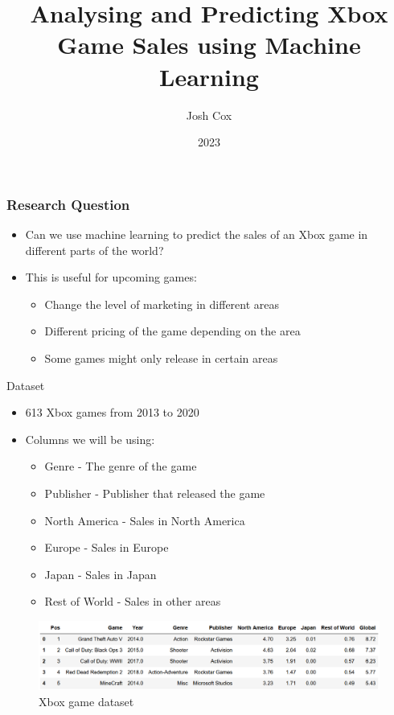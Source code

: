 \documentclass{beamer}
\title{Analysing and Predicting Xbox Game Sales using
Machine Learning}
\author{Josh Cox}
\institute{University Of Exeter}
\date{2023}
\begin{document}
\frame{\titlepage}

\begin{frame}
\frametitle{Research Question}

\begin{itemize}
\setlength\itemsep{1em}
    \item Can we use machine learning to predict the sales of an Xbox game in different parts of the world?
    \item This is useful for upcoming games:
    \medskip
    \begin{itemize}
    \setlength\itemsep{1em}
        \item Change the level of marketing in different areas
        \item Different pricing of the game depending on the area
        \item Some games might only release in certain areas
    \end{itemize}
\end{itemize}

\end{frame}


\begin{frame}{Dataset}

\begin{itemize}
    \item 613 Xbox games from 2013 to 2020 \cite{noauthor_video_nodate}
    \item Columns we will be using:
    \begin{itemize}
        \item Genre - The genre of the game
        \item Publisher - Publisher that released the game
        \item North America - Sales in North America
        \item Europe - Sales in Europe
        \item Japan - Sales in Japan
        \item Rest of World - Sales in other areas
    \end{itemize}
\end{itemize}

\begin{figure}
\centering
    \includegraphics[width=1\textwidth]{img/games_dataset.png}
    \vspace{-8mm}
    \caption{Xbox game dataset}
\end{figure}

\end{frame}
\end{document}

